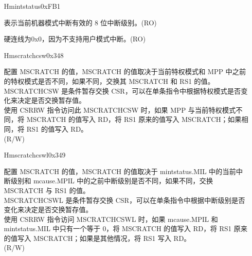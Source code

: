 \begin{register}{H}{mintstatus}{0xFB1}
\label{regdesc:MINTSTATUS}
%
%
%
\regnewline%
\begin{regdesc}\begin{reglist}
\label{fielddesc:MINTSTATUS_MIL}\item [MIL] 表示当前机器模式中断有效的 8 位中断级别。(RO)
\label{fielddesc:MINTSTATUS_UIL}\item [UIL] 硬连线为0x0，因为不支持用户模式中断。(RO)
\end{reglist}\end{regdesc}
\end{register}


\begin{register}{H}{mscratchcsw}{0x348}\label{regdesc:MSCRATCHCSW_REG}
%
\regnewline%
\begin{regdesc}\begin{reglist}
\label{fielddesc:MSCRATCHCSW}\item [MSCRATCHCSW] 配置 MSCRATCH 的值，MSCRATCH 的值取决于当前特权模式和 MPP 中之前的特权模式是否不同，如果不同，交换其 MSCRATCH 和 RS1 的值。\\
MSCRATCHCSW 是条件暂存交换 CSR，可以在单条指令中根据特权模式是否变化来决定是否交换暂存值。\\
使用 CSRRW 指令访问此 MSCRATCHCSW 时，如果 MPP 与当前特权模式不同，将 MSCRATCH 的值写入 RD，将 RS1 原来的值写入 MSCRATCH；如果相同，将 RS1 的值写入 RD。\\
(R/W)
\end{reglist}\end{regdesc}
\end{register}

\begin{register}{H}{mscratchcswl}{0x349}\label{regdesc:MSCRATCHCSWL_REG}
%
\regnewline%
\begin{regdesc}\begin{reglist}
\label{fielddesc:MSCRATCHCSWL}\item [MSCRATCHCSWL] 配置 MSCRATCH 的值，MSCRATCH 的值取决于 mintstatus.MIL 中的当前中断级别和 mcause.MPIL 中的之前中断级别是否不同，如果不同，交换 MSCRATCH 与 RS1 的值。\\
MSCRATCHCSWL 是条件暂存交换 CSR，可以在单条指令中根据中断级别是否变化来决定是否交换暂存值。\\
使用 CSRRW 指令访问 MSCRATCHCSWL 时，如果 mcause.MPIL 和 mintstatus.MIL 中只有一个等于 0，将 MSCRATCH 的值写入 RD，将 RS1 原来的值写入 MSCRATCH；如果是其他情况，将 RS1 写入 RD。\\
(R/W)


\end{reglist}\end{regdesc}
\end{register}

